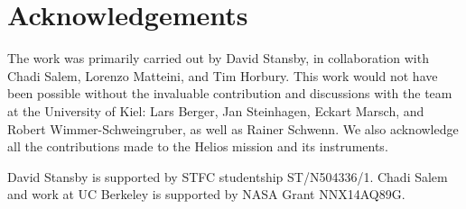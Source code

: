 \documentclass[11pt,a4paper]{article}
\begin{document}
\section{Acknowledgements}
The work was primarily carried out by David Stansby, in collaboration with Chadi Salem, Lorenzo Matteini, and Tim Horbury. This work would not have been possible without the invaluable contribution and discussions with the team at the University of Kiel: Lars Berger, Jan Steinhagen, Eckart Marsch, and Robert Wimmer-Schweingruber, as well as Rainer Schwenn. We also acknowledge all the contributions made to the Helios mission and its instruments.

David Stansby is supported by STFC studentship ST/N504336/1. Chadi Salem and work at UC Berkeley is supported by NASA Grant NNX14AQ89G. 
\end{document}
